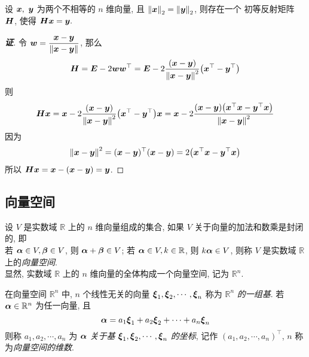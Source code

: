 \begin{theorem}
    设 $\vb*{x},~\vb*{y}$ 为两个不相等的 $n$ 维向量, 且 $\norm{\vb*{x}}_2=\norm{\vb*{y}}_2$, 则存在一个 初等反射矩阵 $\vb*{H}$, 使得 $\vb*{Hx}=\vb*{y}.$
\end{theorem}
\begin{proof}[{\songti \textbf{证}}]
    令 $\vb*{w}=\dfrac{\vb*{x}-\vb*{y}}{\norm{\vb*{x}-\vb*{y}}}$, 那么 $$
    \vb*{H}=\vb*{E}-2\vb*{ww}^\top=\vb*{E}-2\dfrac{(\vb*{x}-\vb*{y})}{\norm{\vb*{x}-\vb*{y}}^2}\qty(\vb*{x}^\top-\vb*{y}^\top)
    $$
    则 $$
    \vb*{Hx}=\vb*{x}-2\dfrac{(\vb*{x}-\vb*{y})}{\norm{\vb*{x}-\vb*{y}}^2}\qty(\vb*{x}^\top-\vb*{y}^\top)\vb*{x}=\vb*{x}-2\dfrac{(\vb*{x}-\vb*{y})\qty(\vb*{x}^\top\vb*{x}-\vb*{y}^\top\vb*{x})}{\norm{\vb*{x}-\vb*{y}}^2}
    $$
    因为 $$
    \norm{\vb*{x}-\vb*{y}}^2=(\vb*{x}-\vb*{y})^\top(\vb*{x}-\vb*{y})=2\qty(\vb*{x}^\top\vb*{x}-\vb*{y}^\top\vb*{x})
    $$
    所以 $\vb*{Hx}=\vb*{x}-(\vb*{x}-\vb*{y})=\vb*{y}$.
\end{proof}
\subsection{向量空间}

\begin{definition}[向量空间]
    设 $ V $ 是实数域 $ \mathbb{R} $ 上的 $ n $ 维向量组成的集合, 如果 $ V $ 关于向量的加法和数乘是封闭的, 即\\
    若 $ \vb*{\alpha} \in V, \vb*{\beta} \in V $, 则 $ \vb*{\alpha}+\vb*{\beta} \in V $; 若 $ \vb*{\alpha} \in V, k \in \mathbb{R} $, 则 $ k \vb*{\alpha} \in V $, 则称 $ V $ 是实数域 $ \mathbb{R} $ 上的\textit{向量空间}.\\
    显然, 实数域 $ \mathbb{R} $ 上的 $ n $ 维向量的全体构成一个向量空间, 记为 $ \mathbb{R}^{n} $.
\end{definition}

\begin{definition}[基与维数]
    在向量空间 $ \mathbb{R}^{n} $ 中, $ n $ 个线性无关的向量 $ \vb*{\xi}_{1}, \vb*{\xi}_{2}, \cdots, \vb*{\xi}_{n} $ 称为 $ \mathbb{R}^{n} $ \textit{的一组基}. 若 $ \vb*{\alpha} \in \mathbb{R}^{n} $ 为任一向量, 且
    $$\vb*{\alpha}=a_{1} \vb*{\xi}_{1}+a_{2} \vb*{\xi}_{2}+\cdots+a_{n} \vb*{\xi}_{n}$$
    则称 $ a_{1}, a_{2}, \cdots, a_{n} $ 为 $ \vb*{\alpha} $ \textit{关于基} $ \vb*{\xi}_{1}, \vb*{\xi}_{2}, \cdots, \vb*{\xi}_{n} $ \textit{的坐标}, 记作 $ \left(a_{1}, a_{2}, \cdots, a_{n}\right)^{\top} $, $n$ 称为\textit{向量空间的维数}.
\end{definition}


